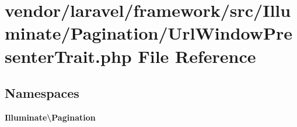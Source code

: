 \section{vendor/laravel/framework/src/\+Illuminate/\+Pagination/\+Url\+Window\+Presenter\+Trait.php File Reference}
\label{_url_window_presenter_trait_8php}
\subsection*{Namespaces}
\begin{DoxyCompactItemize}
\item 
 {\bf Illuminate\textbackslash{}\+Pagination}
\end{DoxyCompactItemize}
